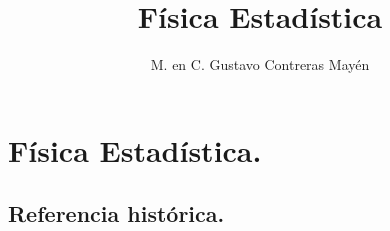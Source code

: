 
\usepackage{chemformula}
\title{Física Estadística\vspace{-3ex}}
\author{M. en C. Gustavo Contreras Mayén}
\date{ }



\vspace{-4cm}
\maketitle
\fontsize{14}{14}\selectfont
\tableofcontents
\newpage

\section{Física Estadística.}
\subsection{Referencia histórica.}



